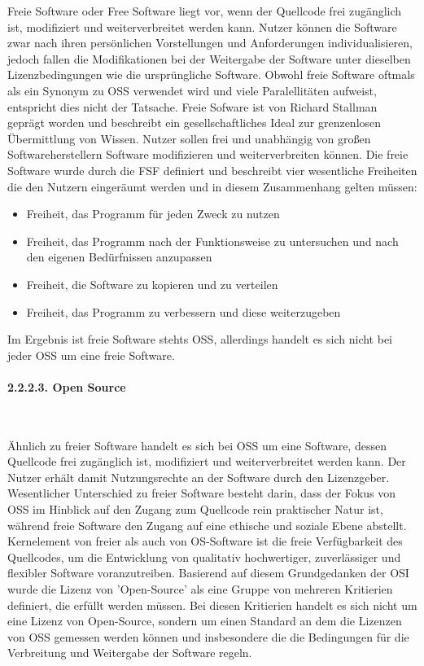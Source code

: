 Freie Software oder Free Software liegt vor, wenn der Quellcode frei zugänglich ist, modifiziert und weiterverbreitet werden kann. Nutzer können die Software zwar nach ihren persönlichen Vorstellungen und Anforderungen individualisieren, jedoch fallen die Modifikationen bei der Weitergabe der Software unter dieselben Lizenzbedingungen wie die ursprüngliche Software. \cite{fsf_freie_3021} Obwohl freie Software oftmals als ein Synonym zu OSS verwendet wird und viele Paralellitäten aufweist, entspricht dies nicht der Tatsache. Freie Sofware ist von Richard Stallman geprägt worden und beschreibt ein gesellschaftliches Ideal zur grenzenlosen Übermittlung von Wissen. \cite[S. 5]{wichmann_linux-_2005} Nutzer sollen frei und unabhängig von großen Softwareherstellern Software modifizieren und weiterverbreiten können. Die freie Software wurde durch die FSF definiert und beschreibt vier wesentliche Freiheiten \cite{fsf_freie_3021} die den Nutzern eingeräumt werden und in diesem Zusammenhang gelten müssen: 

\begin{itemize}
    \item Freiheit, das Programm für jeden Zweck zu nutzen
    \item Freiheit, das Programm nach der Funktionsweise zu untersuchen und nach den eigenen Bedürfnissen anzupassen
    \item Freiheit, die Software zu kopieren und zu verteilen
    \item Freiheit, das Programm zu verbessern und diese weiterzugeben
\end{itemize}

Im Ergebnis ist freie Software stehts OSS, allerdings handelt es sich nicht bei jeder OSS um eine freie Software. \cite[S. 28]{kees_open_2015}

\paragraph{2.2.2.3. Open Source}$~$

Ähnlich zu freier Software handelt es sich bei OSS um eine Software, dessen Quellcode frei zugänglich ist, modifiziert und weiterverbreitet werden kann. Der Nutzer erhält damit Nutzungsrechte an der Software durch den Lizenzgeber. Wesentlicher Unterschied zu freier Software besteht darin, dass der Fokus von OSS im Hinblick auf den Zugang zum Quellcode rein praktischer Natur ist, während freie Software den Zugang auf eine ethische und soziale Ebene abstellt. \cite[S. 28]{kees_open_2015} Kernelement von freier als auch von OS-Software ist die freie Verfügbarkeit des Quellcodes, um die Entwicklung von qualitativ hochwertiger, zuverlässiger und flexibler Software voranzutreiben. Basierend auf diesem Grundgedanken der OSI wurde die Lizenz von 'Open-Source' als eine Gruppe von mehreren Kritierien \cite{open_source_inititative_open_2018} definiert, die erfüllt werden müssen. Bei diesen Kritierien handelt es sich nicht um eine Lizenz von Open-Source, sondern um einen Standard an dem die Lizenzen von OSS gemessen werden können und insbesondere die die Bedingungen für die Verbreitung und Weitergabe der Software regeln. 

